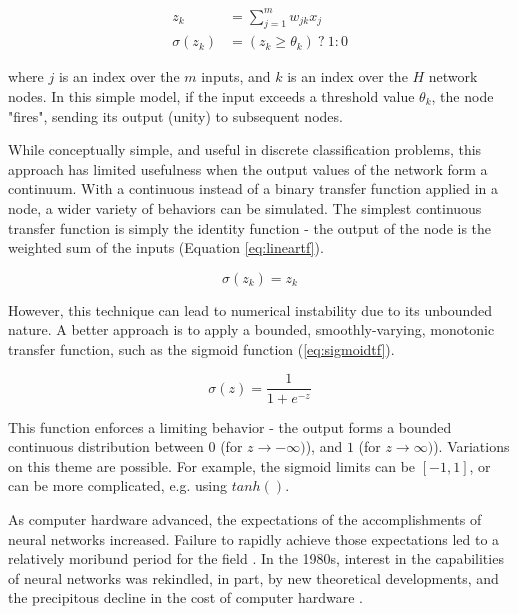 \documentclass{article}
\begin{document}
\begin{equation}
\begin{split}
  z_k &= \sum_{j=1}^m w_{jk} x_j \\
  \sigma(z_k) &= (z_k \ge \theta_k)\ ?\ 1:0
\end{split}
\label{eq:threshholdtf}
\end{equation}

\noindent where $j$ is an index over the $m$ inputs, and $k$ is an index over the $H$ network nodes. In this simple model, if the input exceeds a threshold value $\theta_k$, the node "fires", sending its output (unity) to subsequent nodes.

While conceptually simple, and useful in discrete classification problems, this approach has limited usefulness when the output values of the network form a continuum. With a continuous instead of a binary transfer function applied in a node, a wider variety of behaviors can be simulated. The simplest continuous transfer function is simply the identity function - the output of the node is the weighted sum of the inputs (Equation \ref{eq:lineartf}).

\begin{equation}
  \sigma(z_k) = z_k
  \label{eq:lineartf}
\end{equation}

\noindent However, this technique can lead to numerical instability due to its unbounded nature. A better approach is to apply a bounded, smoothly-varying, monotonic transfer function, such as the sigmoid function (\ref{eq:sigmoidtf}).

\begin{equation}
  \sigma(z) = \frac {1} {1 + e^{-z}}
  \label{eq:sigmoidtf}
\end{equation}

\noindent This function enforces a limiting behavior - the output forms a bounded continuous distribution between $0$ (for $z \rightarrow -\infty)$), and $1$ (for  $z \rightarrow \infty)$). Variations on this theme are possible. For example, the sigmoid limits can be $[-1,1]$, or can be more complicated, e.g. using $tanh()$.

As computer hardware advanced, the expectations of the accomplishments of neural networks increased. Failure to rapidly achieve those expectations led to a relatively moribund period for the field \cite{Minsky1969}. In the 1980s, interest in the capabilities of neural networks was rekindled, in part, by new theoretical developments, and the precipitous decline in the cost of computer hardware \cite{Allman1990}.
\end{document}
